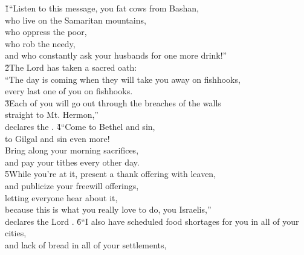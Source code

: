 \begin{poetry}
\poeml {}
\v{1}``Listen to this message, you fat cows from Bashan, \\
\poeml who live on the Samaritan mountains, \\
\poemll    who oppress the poor, \\
\poeml who rob the needy, \\
\poemll    and who constantly ask your husbands for one more drink!'' \\
\poeml \v{2}The Lord  has taken a sacred oath: \\
\poeml ``The day is coming when they will take you away on fishhooks, \\
\poemll    every last one of you on fishhooks. \\
\poeml \v{3}Each of you will go out through the breaches of the walls \\
\poemll    straight to Mt. Hermon,'' \\
\poemlll       declares the .
\poeml \v{4}``Come to Bethel and sin, \\
\poemll    to Gilgal and sin even more! \\
\poeml Bring along your morning sacrifices, \\
\poemll    and pay your tithes every other day. \\
\poeml \v{5}While you're at it, present a thank offering with leaven, \\
\poemll    and publicize your freewill offerings, \\
\poeml letting everyone hear about it, \\
\poemll    because this is what you really love to do, you Israelis,'' \\
\poemlll       declares the Lord .
\poeml \v{6}``I also have scheduled food shortages for you in all of your cities, \\
\poemll    and lack of bread in all of your settlements, \\

\end{poetry}
